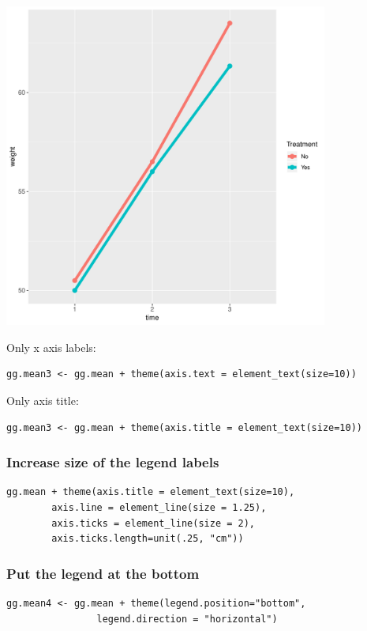\documentclass{article}
\begin{document}
\begin{center}
\includegraphics[width=0.8\textwidth]{./figures/fig-meanTime3.pdf}
\end{center}

Only x axis labels:
\lstset{language=r,label= ,caption= ,captionpos=b,numbers=none}
\begin{lstlisting}
gg.mean3 <- gg.mean + theme(axis.text = element_text(size=10))
\end{lstlisting}

Only axis title:
\lstset{language=r,label= ,caption= ,captionpos=b,numbers=none}
\begin{lstlisting}
gg.mean3 <- gg.mean + theme(axis.title = element_text(size=10))
\end{lstlisting}

\clearpage
\subsubsection{Increase size of the legend labels}
\label{sec:org433a9ce}
\lstset{language=r,label= ,caption= ,captionpos=b,numbers=none}
\begin{lstlisting}
gg.mean + theme(axis.title = element_text(size=10), 
		axis.line = element_line(size = 1.25),
		axis.ticks = element_line(size = 2),
		axis.ticks.length=unit(.25, "cm"))
\end{lstlisting}

\subsubsection{Put the legend at the bottom}
\label{sec:org99b2940}
\lstset{language=r,label= ,caption= ,captionpos=b,numbers=none}
\begin{lstlisting}
gg.mean4 <- gg.mean + theme(legend.position="bottom",
			    legend.direction = "horizontal")
\end{lstlisting}
\end{document}
